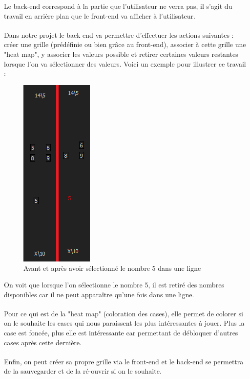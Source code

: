 \documentclass[12pt]{article}
\begin{document}
Le back-end correspond à la partie que l'utilisateur ne verra pas, il s'agit du travail en arrière plan que le front-end va afficher à l'utilisateur. \\ \\ 
Dans notre projet le back-end va permettre d'effectuer les actions suivantes : créer une grille (prédéfinie ou bien grâce au front-end), associer à cette grille une "heat map", y associer les valeurs possible et retirer certaines valeurs restantes lorsque l'on va sélectionner des valeurs. 
\newpage
Voici un exemple pour illustrer ce travail : 
\begin{figure}[ht]
  \begin{center}
    \includegraphics[scale=0.5]{./ressources/retrait.png} 
  \end{center}
  \caption{Avant et après avoir sélectionné le nombre 5 dans une ligne}
\end{figure} 

On voit que lorsque l'on sélectionne le nombre 5, il est retiré des nombres disponibles car il ne peut apparaître qu'une fois dans une ligne. \\ \\
Pour ce qui est de la "heat map" (coloration des cases), elle permet de colorer si on le souhaite les cases qui nous paraissent les plus intéressantes à jouer. Plus la case est foncée, plus elle est intéressante car permettant de débloquer d'autres cases après cette dernière. \\ \\
Enfin, on peut créer sa propre grille via le front-end et le back-end se permettra de la sauvegarder et de la ré-ouvrir si on le souhaite. 
\newpage
\end{document}
